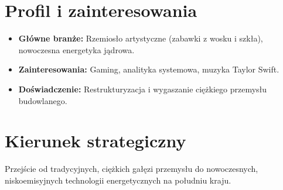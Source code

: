 \section*{Profil i zainteresowania}
\begin{itemize}
\item \textbf{Główne branże:} Rzemiosło artystyczne (zabawki z wosku i szkła), nowoczesna energetyka jądrowa.
\item \textbf{Zainteresowania:} Gaming, analityka systemowa, muzyka Taylor Swift.
\item \textbf{Doświadczenie:} Restrukturyzacja i wygaszanie ciężkiego przemysłu budowlanego.
\end{itemize}

\section*{Kierunek strategiczny}
Przejście od tradycyjnych, ciężkich gałęzi przemysłu do nowoczesnych, niskoemisyjnych technologii energetycznych na południu kraju.